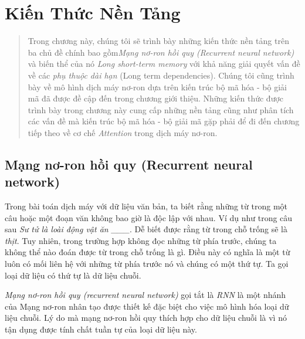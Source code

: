 \chapter{Kiến Thức Nền Tảng}
\ifpdf
    \graphicspath{{Chapter2/Chapter2Figs/PNG/}{Chapter2/Chapter2Figs/PDF/}{Chapter2/Chapter2Figs/}}
\else
    \graphicspath{{Chapter2/Chapter2Figs/EPS/}{Chapter2/Chapter2Figs/}}
\fi

\begin{quote}

Trong chương này, chúng tôi sẽ trình bày những kiến thức nền tảng trên ba chủ đề chính bao gồm\textit{Mạng nơ-ron hồi quy (Recurrent neural network)} và biến thể của nó \textit{Long short-term memory} với khả năng giải quyết vấn đề về các \textit{phụ thuộc dài hạn} (Long term dependencies). Chúng tôi cũng trình bày về mô hình dịch máy nơ-ron dựa trên kiến trúc bộ mã hóa - bộ giải mã đã được đề cập đến trong chương giới thiệu. Những kiến thức được trình bày trong chương này cung cấp những nền tảng cũng như phân tích các vấn đề mà kiến trúc bộ mã hóa - bộ giải mã gặp phải để đi đến chương tiếp theo về cơ chế \textit{Attention} trong dịch máy nơ-ron.

\end{quote}
\section{Mạng nơ-ron hồi quy (Recurrent neural network)}

Trong bài toán dịch máy với dữ liệu văn bản, ta biết rằng những từ trong một câu hoặc một đoạn văn không bao giờ là độc lập với nhau. Ví dụ như trong câu sau \textit{Sư tử là loài động vật ăn \_\_\_}. Dễ biết được rằng từ trong chỗ trống sẽ là \textit{thịt}. Tuy nhiên, trong trường hợp không đọc những từ phía trước, chúng ta không thể nào đoán được từ trong chỗ trống là gì. Điều này có nghĩa là một từ luôn có mối liên hệ với những từ phía trước nó và chúng có một thứ tự. Ta gọi loại dữ liệu có thứ tự là dữ liệu chuỗi.

\textit{Mạng nơ-ron hồi quy (recurrent neural network)} \cite{rnnorigin} gọi tắt là \textit{RNN} là một nhánh của Mạng nơ-ron nhân tạo được thiết kế đặc biệt cho việc mô hình hóa loại dữ liệu chuỗi. Lý do mà mạng nơ-ron hồi quy thích hợp cho dữ liệu chuỗi là vì nó tận dụng được tính chất tuần tự của loại dữ liệu này.

